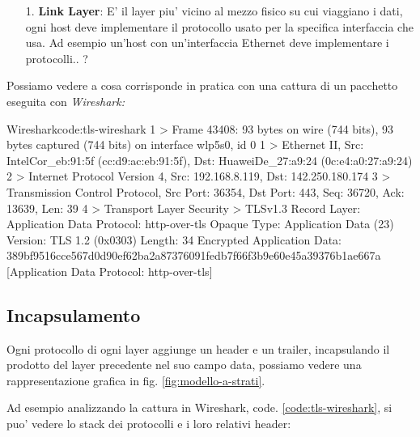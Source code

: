 \begin{enumerate}
    \item[1.] \textbf{Link Layer}: E' il layer piu' vicino al mezzo fisico su cui viaggiano i dati, ogni host deve implementare il protocollo usato per la specifica interfaccia che usa. Ad esempio un'host con un'interfaccia Ethernet deve implementare i protocolli.. ?
    

\end{enumerate}

Possiamo vedere a cosa corrisponde in pratica con una cattura di un pacchetto eseguita con \it{Wireshark}:

\begin{bashcode}{Wireshark}{code:tls-wireshark}
1 > Frame 43408: 93 bytes on wire (744 bits), 93 bytes captured (744 bits) on interface wlp5s0, id 0
1 > Ethernet II, Src: IntelCor_eb:91:5f (cc:d9:ac:eb:91:5f), Dst: HuaweiDe_27:a9:24 (0c:e4:a0:27:a9:24)
2 > Internet Protocol Version 4, Src: 192.168.8.119, Dst: 142.250.180.174
3 > Transmission Control Protocol, Src Port: 36354, Dst Port: 443, Seq: 36720, Ack: 13639, Len: 39
4 > Transport Layer Security
     > TLSv1.3 Record Layer: Application Data Protocol: http-over-tls
             Opaque Type: Application Data (23)
             Version: TLS 1.2 (0x0303)
             Length: 34
             Encrypted Application Data: 389bf9516cce567d0d90ef62ba2a87376091fedb7f66f3b9e60e45a39376b1ae667a
             [Application Data Protocol: http-over-tls]
\end{bashcode}

\subsection{Incapsulamento}

Ogni protocollo di ogni layer aggiunge un header e un trailer, incapsulando il prodotto del layer precedente nel suo campo data, possiamo vedere una rappresentazione grafica in fig. \ref{fig:modello-a-strati}.

Ad esempio analizzando la cattura in Wireshark, code. \ref{code:tls-wireshark}, si puo' vedere lo stack dei protocolli e i loro relativi header:

